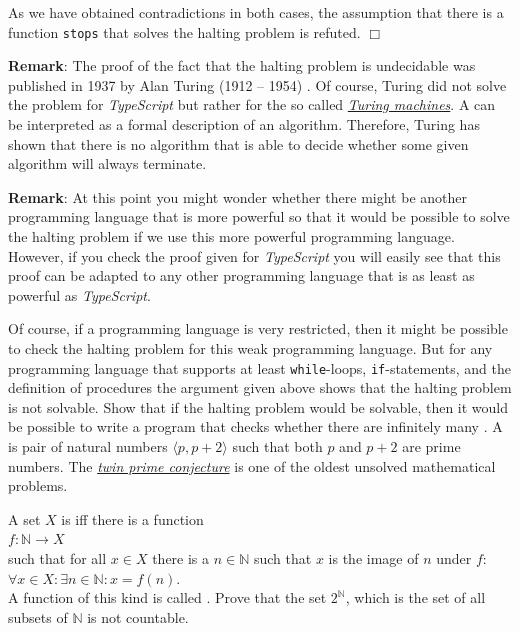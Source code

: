 As we have obtained contradictions in both cases, the assumption that there is a function
\texttt{stops} that solves the halting problem is refuted.
\hspace*{\fill} $\Box$
\vspace*{0.3cm}

\noindent
\textbf{Remark}:
The proof of the fact that the halting problem is undecidable was published in 1937 by Alan Turing (1912 -- 1954)
\cite{turing:1937}.
Of course, Turing did not solve the problem for \textsl{TypeScript} but rather
for the so called 
\href{http://en.wikipedia.org/wiki/Indirect_proof}{\emph{Turing machines}}.
A   
can be interpreted as a formal description of an algorithm.
Therefore, Turing has shown that there is no algorithm that is able to decide whether some given
algorithm will always terminate.
\vspace*{0.3cm}

\noindent
\textbf{Remark}:
At this point you might wonder whether there might be another programming language
that is more powerful so that it would be possible to solve the halting problem if we use this more powerful
programming language.
However, if you check the proof given for \textsl{TypeScript} you will easily
see that this proof can be adapted to any other programming language that is as least as powerful as
\textsl{TypeScript}.
\eox

Of course, if a programming language is very restricted, then it might be possible to check the
halting problem for this weak programming language.
But for any programming language that supports
at least \texttt{while}-loops, \texttt{if}-statements, and the definition of procedures the argument
given above shows that the halting problem is not solvable.
\exerciseEng
Show that if the halting problem would be solvable, then it would be possible to write a program that checks
whether there are infinitely many .
A  is pair of natural numbers
$\langle p, p + 2 \rangle$ such that both $p$ and $p+2$ are prime numbers.
The \href{http://en.wikipedia.org/wiki/Twin_prime_conjecture}{\emph{twin prime conjecture}} is one
of the oldest unsolved mathematical problems.
\eox

\exerciseEng
A set $X$ is  iff there is a function 
\\[0.2cm]
\hspace*{1.3cm}
 $f: \mathbb{N} \rightarrow X$ 
\\[0.2cm]
such that for all $x\in X$ there is a $n \in \mathbb{N}$ such that $x$ is the image of
$n$ under $f$: 
\\[0.2cm]
\hspace*{1.3cm} $\forall x \in X: \exists n \in \mathbb{N}: x = f(n)$.
\\[0.2cm]
A function of this kind is called . 
Prove that the set $2^\mathbb{N}$, which is the set of all subsets of $\mathbb{N}$ is not countable.
\vspace*{0.2cm}

